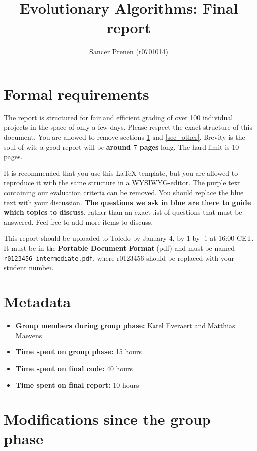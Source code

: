 \documentclass[a4paper,10pt]{article}
\title{Evolutionary Algorithms: Final report}
\author{Sander Prenen (r0701014)}
\newcommand{\nextyear}{\advance\year by 1 \the\year\advance\year by -1}
\newcommand{\deadlineReport}{January 4, \nextyear{} at 16:00 CET}
\newcommand{\ReplaceMe}[1]{{\color{blue}#1}}
\newcommand{\RemoveMe}[1]{{\color{purple}#1}}
\begin{document}
\selectfont{}

\maketitle

\section{\RemoveMe{Formal requirements}} \label{sec_this}

\RemoveMe{The report is structured for fair and efficient grading of over 100 individual projects in the space of only a few days. Please respect the exact structure of this document. You are allowed to remove sections \ref{sec_this} and \ref{sec_other}. Brevity is the soul of wit: a good report will be \textbf{around $7$ pages} long. The hard limit is 10 pages. 

It is recommended that you use this \LaTeX{} template, but you are allowed to reproduce it with the same structure in a WYSIWYG-editor. The purple text containing our evaluation criteria can be removed. You should replace the blue text with your discussion. \textbf{The questions we ask in blue are there to guide which topics to discuss}, rather than an exact list of questions that must be answered. Feel free to add more items to discuss.

This report should be uploaded to Toledo by \deadlineReport. It must be in the \textbf{Portable Document Format} (pdf) and must be named \texttt{r0123456\_intermediate.pdf}, where r0123456 should be replaced with your student number.}

\section{Metadata}

\begin{itemize}
 \item \textbf{Group members during group phase:} Karel Everaert and Matthias Maeyens
 \item \textbf{Time spent on group phase:} 15 hours
 \item \textbf{Time spent on final code:} \ReplaceMe{40 hours}
 \item \textbf{Time spent on final report:} \ReplaceMe{10 hours}
\end{itemize}

\section{Modifications since the group phase}
\end{document}
